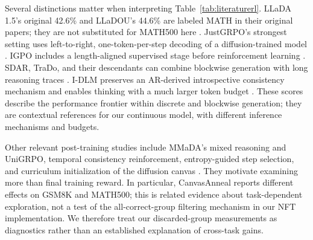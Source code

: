 Several distinctions matter when interpreting Table~\ref{tab:literaturerl}. LLaDA 1.5's original 42.6\% and LLaDOU's 44.6\% are labeled MATH in their original papers; they are not substituted for MATH500 here \citep{llada15,lladou}. JustGRPO's strongest setting uses left-to-right, one-token-per-step decoding of a diffusion-trained model \citep{justgrpo}. IGPO includes a length-aligned supervised stage before reinforcement learning \citep{igpo}. SDAR, TraDo, and their descendants can combine blockwise generation with long reasoning traces \citep{sdar,trado}. I-DLM preserves an AR-derived introspective consistency mechanism and enables thinking with a much larger token budget \citep{idllm}. These scores describe the performance frontier within discrete and blockwise generation; they are contextual references for our continuous model, with different inference mechanisms and budgets.

Other relevant post-training studies include MMaDA's mixed reasoning and UniGRPO, temporal consistency reinforcement, entropy-guided step selection, and curriculum initialization of the diffusion canvas \citep{mmada,midtruth,egspo,canvasanneal}. They motivate examining more than final training reward. In particular, CanvasAnneal reports different effects on GSM8K and MATH500; this is related evidence about task-dependent exploration, not a test of the all-correct-group filtering mechanism in our NFT implementation. We therefore treat our discarded-group measurements as diagnostics rather than an established explanation of cross-task gains.

